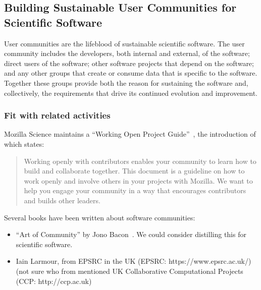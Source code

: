 \subsection{Building Sustainable User Communities for Scientific Software}


User communities are the lifeblood of sustainable scientific software. The user
community includes the developers, both internal and external, of the software;
direct users of the software; other software projects that depend on the
software; and any other groups that create or consume data that is specific to
the software. Together these groups provide both the reason for sustaining the
software and, collectively, the requirements that drive its continued evolution
and improvement.

\subsubsection{Fit with related activities}

Mozilla Science maintains a ``Working Open Project
Guide''~\cite{working-open-wssspe3}, the introduction of which states:
\begin{quote}
Working openly with contributors enables your community to learn how to build
and collaborate together. This document is a guideline on how to work openly and
involve others in your projects with Mozilla. We want to help you engage your
community in a way that encourages contributors and builds other leaders.
 \end{quote}

Several books have been written about software communities: 
\begin{itemize}

\item ``Art of Community'' by Jono Bacon~\cite{art-of-community}. We could
consider distilling this for scientific software.

\item Iain Larmour, from EPSRC in the UK (EPSRC: https://www.epsrc.ac.uk/) (not
sure who from mentioned UK Collaborative Computational Projects (CCP:
http://ccp.ac.uk) 

\end{itemize}

